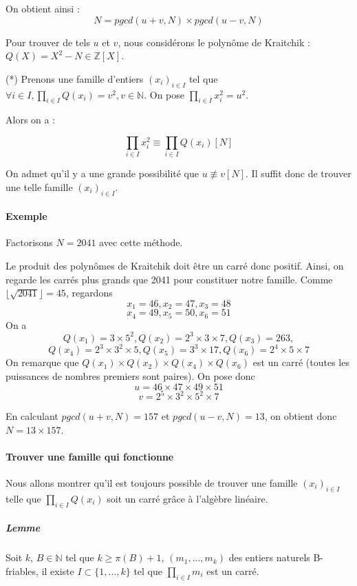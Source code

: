 \documentclass[11pt,a4paper]{article}
\begin{document}
	On obtient ainsi :
	$$N = pgcd(u+v, N) \times pgcd(u-v, N)$$
	
	Pour trouver de tels $u$ et $v$, nous considérons le polynôme de Kraitchik : $Q(X) = X^2 - N  \in \mathbb{Z}[X]$.
	
	(*) Prenons une famille d'entiers $(x_i)_{i \in I}$ tel que $\forall i \in I, \prod_{i \in I} Q(x_i) = v^2, v \in \mathbb{N}$. On pose $\prod_{i \in I}x_i^2 = u^2$.
	
	 Alors on a : 
	
		$$\prod_{i \in I} x_i^2 \equiv \prod_{i \in I} Q(x_i) [N]$$
		
	On admet qu'il y a une grande possibilité que $u \not\equiv v [N]$.	
	Il suffit donc de trouver une telle famille $(x_i)_{i \in I}$.
	
	\paragraph{Exemple}
	Factorisons $N = 2041$ avec cette méthode.
	
	Le produit des polynômes de Kraitchik doit être un carré donc positif. Ainsi, on regarde les carrés plus grands que 2041 pour constituer notre famille.
	Comme $\lfloor \sqrt{2041} \rfloor = 45$, regardons 
	$$ x_1 = 46,  x_2 = 47, x_3 = 48$$ $$x_4 = 49, x_5 = 50, x_6 = 51$$
	On a 
	$$ Q(x_1) = 3 \times 5^2, Q(x_2) = 2^3 \times 3 \times 7, Q(x_3) = 263,$$
	$$ Q(x_4) = 2^3 \times 3^2 \times 5, Q(x_5) = 3^3 \times 17, Q(x_6) = 2^4 \times 5 \times 7$$
	On remarque que $Q(x_1) \times Q(x_2) \times Q(x_4) \times Q(x_6)$ est un carré (toutes les puissances de nombres premiers sont paires). On pose donc 
	$$u = 46 \times 47 \times 49 \times 51$$ $$v = 2^5 \times 3^2 \times 5^2 \times 7$$
	
	En calculant $pgcd(u+v, N) = 157$ et $pgcd(u-v, N) = 13$, on obtient donc $N = 13 \times 157$.
	
	\paragraph{Trouver une famille qui fonctionne}
	Nous allons montrer qu'il est toujours possible de trouver une famille $(x_i)_{i \in I}$ telle que $\prod_{i \in I} Q(x_i)$ soit un carré grâce à l'algèbre linéaire.

	\subparagraph{Lemme}
		Soit $k$, $B \in \mathbb{N}$ tel que $k \ge \pi(B) + 1$, $(m_1, ..., m_k)$ des entiers naturels B-friables,
		il existe $I \subset \{1, ..., k\}$ tel que $\prod_{i \in I} m_i$ est un carré.
		
\end{document}
